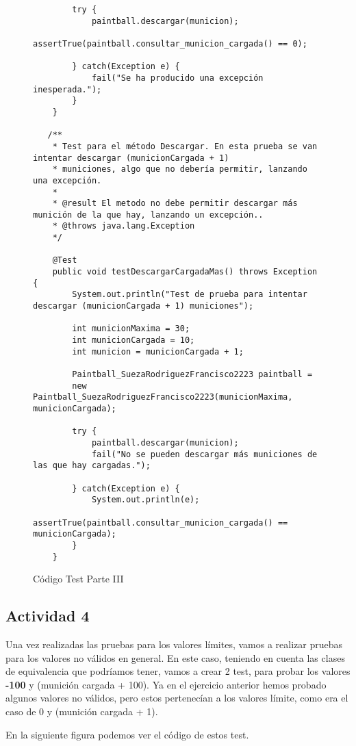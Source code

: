 \begin{figure}[H]
\begin{tcolorbox}[sharp corners, colback=yellow!30, colframe=white!20]
\begin{verbatim}
        try {
            paintball.descargar(municion);
            assertTrue(paintball.consultar_municion_cargada() == 0);

        } catch(Exception e) {
            fail("Se ha producido una excepción inesperada.");
        }
    }

   /**
    * Test para el método Descargar. En esta prueba se van intentar descargar (municionCargada + 1)
    * municiones, algo que no debería permitir, lanzando una excepción.
    *
    * @result El metodo no debe permitir descargar más munición de la que hay, lanzando un excepción..
    * @throws java.lang.Exception
    */

    @Test
    public void testDescargarCargadaMas() throws Exception {
        System.out.println("Test de prueba para intentar descargar (municionCargada + 1) municiones");

        int municionMaxima = 30;
        int municionCargada = 10;
        int municion = municionCargada + 1;

        Paintball_SuezaRodriguezFrancisco2223 paintball =
        new Paintball_SuezaRodriguezFrancisco2223(municionMaxima, municionCargada);

        try {
            paintball.descargar(municion);
            fail("No se pueden descargar más municiones de las que hay cargadas.");

        } catch(Exception e) {
            System.out.println(e);
            assertTrue(paintball.consultar_municion_cargada() == municionCargada);
        }
    }

        \end{verbatim}
    \end{tcolorbox}
    \caption{Código Test Parte III}
\end{figure}

\subsection{Actividad 4}
Una vez realizadas las pruebas para los valores límites, vamos a realizar pruebas para los valores no válidos en general. En este caso, teniendo en cuenta las clases de equivalencia que podríamos tener, vamos a crear 2 test, para probar los valores \textbf{-100} y (munición cargada + 100). Ya en el ejercicio anterior hemos probado algunos valores no válidos, pero estos pertenecían a los valores límite, como era el caso de 0 y (munición cargada + 1).

En la siguiente figura podemos ver el código de estos test.

